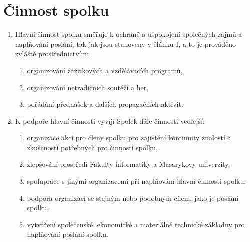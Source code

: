 \documentclass[11pt,a4paper]{article}
\begin{document}
\section{Činnost spolku}
\begin{enumerate}[itemsep=0pt]
    \item Hlavní činnost spolku směřuje k ochraně a uspokojení společných zájmů 
    a naplňování poslání, tak jak jsou stanoveny v článku I, a to je prováděno 
    zvláště prostřednictvím: 
    \begin{enumerate}[itemsep=0pt,topsep=0pt]
        \item organizování zážitkových a vzdělávacích programů,
        \item organizování netradičních soutěží a her,
        \item pořádání přednášek a dalších propagačních aktivit.
    \end{enumerate}
    \item K podpoře hlavní činnosti vyvíjí Spolek dále činnosti vedlejší: 
    \begin{enumerate}[itemsep=0pt,topsep=0pt]
        \item organizace akcí pro členy spolku pro zajištění kontinuity znalostí
         a zkušeností potřebných pro činnosti spolku,
        \item zlepšování prostředí Fakulty informatiky a Masarykovy univerzity,
        \item spolupráce s jinými organizacemi při naplňování hlavní činnosti 
        spolku,
        \item podpora organizací se stejným nebo podobným cílem, jako je 
        poslání spolku,
        \item vytváření společenské, ekonomické a materiálně technické 
        základny pro naplňování poslání spolku.
    \end{enumerate}
\end{enumerate}
\end{document}
